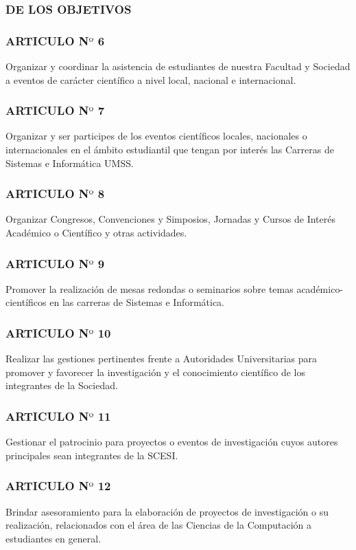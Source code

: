 \documentclass[11pt,letterpaper]{book}
\begin{document}
\subsubsection*{DE LOS OBJETIVOS}

\subsubsection*{ARTICULO N$º$ 6}
Organizar y coordinar la asistencia de estudiantes de nuestra Facultad y Sociedad a eventos de carácter científico a nivel local, nacional e internacional.
\subsubsection*{ARTICULO N$º$ 7}
Organizar y ser participes de los eventos científicos locales, nacionales o internacionales en el ámbito estudiantil que tengan por interés las Carreras de Sistemas e Informática UMSS. 
\subsubsection*{ARTICULO N$º$ 8}
Organizar Congresos, Convenciones y Simposios, Jornadas y Cursos de Interés Académico o Científico y otras actividades.
\subsubsection*{ARTICULO N$º$ 9}
Promover la realización de mesas redondas o seminarios sobre temas académico-científicos en las carreras de Sistemas e Informática.
\subsubsection*{ARTICULO N$º$ 10}
Realizar las gestiones pertinentes frente a Autoridades Universitarias para promover y favorecer la investigación y el conocimiento científico de los integrantes de la Sociedad.
\subsubsection*{ARTICULO N$º$ 11}
Gestionar el patrocinio para proyectos o eventos de investigación cuyos autores principales sean integrantes de la SCESI. 
\subsubsection*{ARTICULO N$º$ 12}
Brindar asesoramiento para la elaboración de proyectos de investigación o su realización, relacionados con el área de las Ciencias de la Computación a estudiantes en general.
\end{document}
